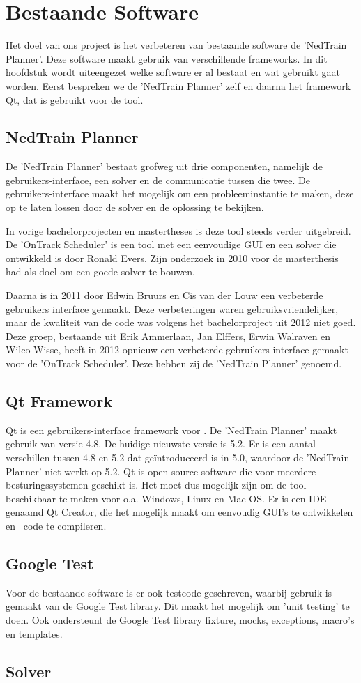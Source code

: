 \section{Bestaande Software}
Het doel van ons project is het verbeteren van bestaande software de 'NedTrain Planner'. Deze software maakt gebruik van verschillende frameworks. In dit hoofdstuk wordt uiteengezet welke software er al bestaat en wat gebruikt gaat worden. Eerst bespreken we de 'NedTrain Planner' zelf en daarna het framework Qt, dat is gebruikt voor de tool.

\subsection{NedTrain Planner}
De 'NedTrain Planner' bestaat grofweg uit drie componenten, namelijk de gebruikers-interface, een solver en de communicatie tussen die twee. De gebruikers-interface maakt het mogelijk om een probleeminstantie te maken, deze op te laten lossen door de solver en de oplossing te bekijken.

In vorige bachelorprojecten en mastertheses is deze tool steeds verder uitgebreid. De 'OnTrack Scheduler' is een tool met een eenvoudige GUI en een solver die ontwikkeld is door Ronald Evers. Zijn onderzoek in 2010 voor de masterthesis had als doel om een goede solver te bouwen. \cite{ronaldevers2010}

Daarna is in 2011 door Edwin Bruurs en Cis van der Louw een verbeterde gebruikers interface gemaakt.\cite{bep2011nedtrain} Deze verbeteringen waren gebruiksvriendelijker, maar de kwaliteit van de code was volgens het bachelorproject uit 2012 niet goed.\cite{bep2012nedtrain} Deze groep, bestaande uit Erik Ammerlaan, Jan Elffers, Erwin Walraven en Wilco Wisse, heeft in 2012 opnieuw een verbeterde gebruikers-interface gemaakt voor de 'OnTrack Scheduler'. Deze hebben zij de 'NedTrain Planner' genoemd.

\subsection{Qt Framework}
Qt is een gebruikers-interface framework voor \cpp . De 'NedTrain Planner' maakt gebruik van versie 4.8. De huidige nieuwste versie is 5.2. Er is een aantal verschillen tussen 4.8 en 5.2 dat ge\"introduceerd is in 5.0, waardoor de 'NedTrain Planner' niet werkt op 5.2. Qt is open source software die voor meerdere besturingssystemen geschikt is. Het moet dus mogelijk zijn om de tool beschikbaar te maken voor o.a. Windows, Linux en Mac OS. Er is een IDE genaamd Qt Creator, die het mogelijk maakt om eenvoudig GUI's te ontwikkelen en \cpp\ code te compileren. \cite{seminarium2014}

\subsection{Google Test}
Voor de bestaande software is er ook testcode geschreven, waarbij gebruik is gemaakt van de Google Test library. Dit maakt het mogelijk om 'unit testing' te doen. Ook ondersteunt de Google Test library fixture, mocks, exceptions, macro's en templates.

\subsection{Solver}

